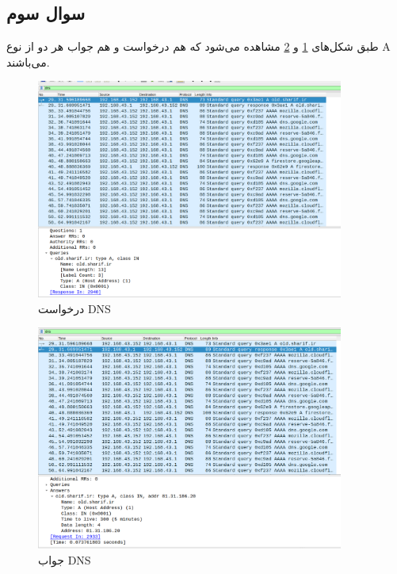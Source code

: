 \documentclass{article}
\begin{document}
\subsection{سوال سوم}
طبق شکل‌های \ref{fig:dnsreq} و \ref{fig:dnsresp} مشاهده می‌شود که هم درخواست و هم جواب هر دو از نوع A می‌باشند.
\begin{figure}[h!]
	\centering
	\includegraphics[width=0.9\textwidth]{src/dnsreq.png}
	\caption{
		درخواست DNS	
	}
	\label{fig:dnsreq}
\end{figure}
\begin{figure}[h!]
	\centering
	\includegraphics[width=0.9\textwidth]{src/dnsresp.png}
	\caption{
		جواب DNS	
	}
	\label{fig:dnsresp}
\end{figure}
\end{document}
